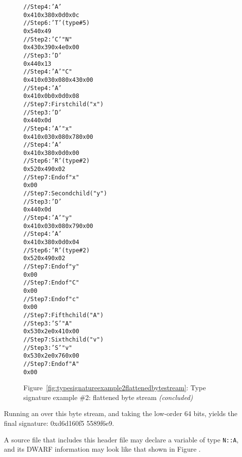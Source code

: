 \begin{figure}
\begin{dwflisting}
\begin{alltt}
    // Step 4: 'A' \DWATdatamemberlocation {}
    0x41 0x38 0x0d 0x0c
    // Step 6: 'T' \DWATtype (type \#5)
    0x54 0x49
        // Step 2: 'C' \DWTAGnamespace "N"
        0x43 0x39 0x4e 0x00
        // Step 3: 'D' \DWTAGstructuretype
        0x44 0x13
        // Step 4: 'A' \DWATname \DWFORMstring "C"
        0x41 0x03 0x08 0x43 0x00
        // Step 4: 'A' \DWATbytesize {}
        0x41 0x0b 0x0d 0x08
        // Step 7: First child ("x")
            // Step 3: 'D' \DWTAGmember
            0x44 0x0d
            // Step 4: 'A' \DWATname \DWFORMstring "x"
            0x41 0x03 0x08 0x78 0x00
            // Step 4: 'A' \DWATdatamemberlocation {}
            0x41 0x38 0x0d 0x00
            // Step 6: 'R' \DWATtype (type \#2)
            0x52 0x49 0x02
            // Step 7: End of \DWTAGmember "x"
            0x00
        // Step 7: Second child ("y")
            // Step 3: 'D' \DWTAGmember
            0x44 0x0d
            // Step 4: 'A' \DWATname \DWFORMstring "y"
            0x41 0x03 0x08 0x79 0x00
            // Step 4: 'A' \DWATdatamemberlocation {}
            0x41 0x38 0x0d 0x04
            // Step 6: 'R' \DWATtype (type \#2)
            0x52 0x49 0x02
            // Step 7: End of \DWTAGmember "y"
            0x00
        // Step 7: End of \DWTAGstructuretype "C"
        0x00
    // Step 7: End of \DWTAGmember "c"
    0x00
// Step 7: Fifth child ("A")
    // Step 3: 'S' \DWTAGsubprogram "A"
    0x53 0x2e 0x41 0x00
// Step 7: Sixth child ("v")
    // Step 3: 'S' \DWTAGsubprogram "v"
    0x53 0x2e 0x76 0x00
// Step 7: End of \DWTAGstructuretype "A"
0x00
\end{alltt}
\end{dwflisting}
\begin{center}
\vspace{2mm}
Figure~\ref{fig:typesignatureexample2flattenedbytestream}: Type signature example \#2: flattened byte stream \textit{(concluded)}
\end{center}
\end{figure}

Running an  over this byte stream, and taking the
low-order 64 bits, yields the final signature: 0xd6d160f5
5589f6e9.


A source file that includes this header file may declare a
variable of type \texttt{N::A}, and its DWARF information may look
like that shown in 
Figure .

